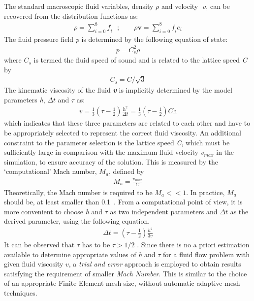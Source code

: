 The standard macroscopic fluid variables, density $\rho$ and velocity $\mathbf{\textit{ v}}$, can be recovered from the distribution functions as:
\begin{align}
\rho = \sum\limits_{\textit{i}=0}^{8}{\textit{f}_{\textit{i}}}\mbox{ }; \qquad \rho \mathbf{v} = \sum\limits_{\textit{i}=0}^{8}{\textit{f}_{\textit{i}}\mathbf{\textit{e}}_{\textit{i}}}
\end{align}
The fluid pressure field \textit{p} is determined by the following equation of state:
\begin{align}
\textit{p}=\textit{C}_{\textit{s}}^{2} \rho
\end{align}
where $\textit{C}_{\textit{s}}$ is termed the fluid speed of sound and is related to the lattice speed \textit{C} by
\begin{align}
\textit{C}_{s}=\textit{C}/\sqrt{3}
\end{align}
The kinematic viscosity of the fluid \textbf{\textit{v}} is implicitly determined by the model parameters \textit{h}, $\Delta \textit{t}$ and $\tau$ as:
\begin{align}
\textit{v}=\frac{1}{3}(\tau - \frac{1}{2})\frac{\textit{h}^{2}}{\Delta \textit{t}} = \frac{1}{3}(\tau - \frac{1}{2})\textit{Ch}
\end{align}
which indicates that these three parameters are related to each other and have to be appropriately selected to represent the correct fluid viscosity. An additional constraint to the parameter selection is the lattice speed \textit{C}, which must be sufficiently large in comparison with the maximum fluid velocity $\textit{v}_{\textit{max}}$ in the simulation, to ensure accuracy of the solution. This is measured by the `computational' Mach number, $\textit{M}_{\textit{a}}$, defined by
\begin{align}
\textit{M}_{\textit{a}}=\frac{\textit{v}_{\textit{max}}}{\textit{C}}
\end{align}
Theoretically, the Mach number is required to be $\textit{M}_{\textit{a}}<< 1$. In practice, $\textit{M}_{\textit{a}}$ should be, at least smaller than 0.1~\citep{he1997}. From a computational point of view, it is more convenient to choose \textit{h} and $\tau$ as two independent parameters and $\Delta \textit{t}$ as the derived parameter, using the following equation.
\begin{align}
\Delta \textit{t} = (\tau - \frac{1}{2}) \frac{h^{2}}{3\textit{v}}
\end{align}
It can be observed that $\tau$ has to be $\tau > 1/2$ \citep{he1997}. Since there is no a priori estimation available to determine appropriate values of \textit{h} and $\tau$ for a fluid flow problem with given fluid viscosity $\textit{v}$, a \textit{trial and error} approach is employed to obtain results satisfying the requirement of smaller \textit{Mach Number}. This is similar to the choice of an appropriate Finite Element mesh size, without automatic adaptive mesh techniques. 
